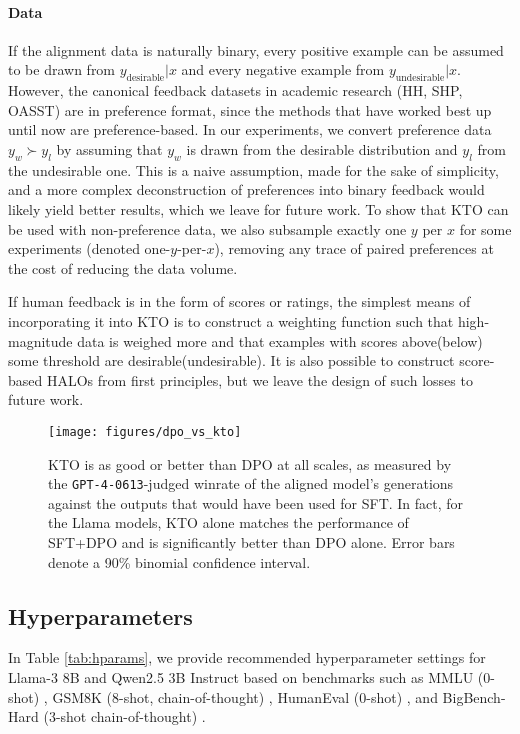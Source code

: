 \paragraph{Data} 
If the alignment data is naturally binary, every positive example can be assumed to be drawn from $y_\text{desirable}|x$ and every negative example from $y_\text{undesirable}|x$.
However, the canonical feedback datasets in academic research (HH, SHP, OASST) are in preference format, since the methods that have worked best up until now are preference-based.
In our experiments, we convert preference data $y_w \succ y_l$ by assuming that $y_w$ is drawn from the desirable distribution and $y_l$ from the undesirable one.
This is a naive assumption, made for the sake of simplicity, and a more complex deconstruction of preferences into binary feedback would likely yield better results, which we leave for future work.
To show that KTO can be used with non-preference data, we also subsample exactly one $y$ per $x$ for some experiments (denoted one-$y$-per-$x$), removing any trace of paired preferences at the cost of reducing the data volume.

If human feedback is in the form of scores or ratings, the simplest means of incorporating it into KTO is to construct a weighting function such that high-magnitude data is weighed more and that examples with scores above(below) some threshold are desirable(undesirable).
It is also possible to construct score-based HALOs from first principles, but we leave the design of such losses to future work. 

\begin{figure*}[ht]
    \centering
    \texttt{[image: figures/dpo\_vs\_kto]}
    \vspace{-15pt}
    \caption{KTO is as good or better than DPO at all scales,  as measured by the \texttt{GPT-4-0613}-judged winrate of the aligned model's generations against the outputs that would have been used for SFT. 
    In fact, for the Llama models, KTO alone matches the performance of SFT+DPO and is significantly better than DPO alone.
    Error bars denote a 90\% binomial confidence interval.}
    \label{fig:dpo_vs_kto}
\end{figure*}

\subsection{Hyperparameters} 

In Table \ref{tab:hparams}, we provide recommended hyperparameter settings for Llama-3 8B \citep{dubey2024llama} and Qwen2.5 3B Instruct \citep{yang2024qwen2} based on benchmarks such as MMLU (0-shot) \citep{hendryckstest2021}, GSM8K (8-shot, chain-of-thought) \citep{cobbe2021gsm8k}, HumanEval (0-shot) \citep{chen2021evaluating}, and BigBench-Hard (3-shot chain-of-thought) \citep{srivastava2022beyond}.

